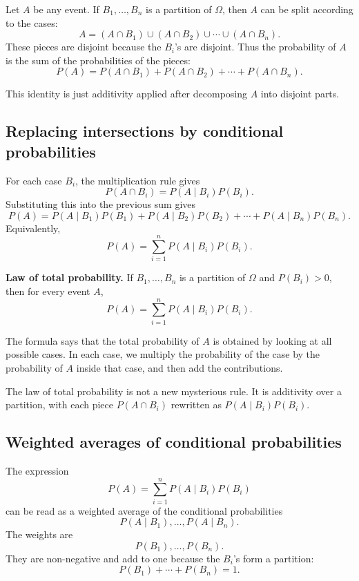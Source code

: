 Let \(A\) be any event. If \(B_1,
\ldots,B_n\) is a partition of \(\Omega\), then
\(A\) can be split according to the cases:
\[
A=(A\cap B_1)\cup(A\cap B_2)\cup\cdots\cup(A\cap B_n).
\]
These pieces are disjoint because the \(B_i\)'s are disjoint. Thus the
probability of \(A\) is the sum of the probabilities of the pieces:
\[
P(A)=P(A\cap B_1)+P(A\cap B_2)+\cdots+P(A\cap B_n).
\]

This identity is just additivity applied after decomposing \(A\) into disjoint
parts.

\subsection*{Replacing intersections by conditional probabilities}

For each case \(B_i\), the multiplication rule gives
\[
P(A\cap B_i)=P(A\mid B_i)P(B_i).
\]
Substituting this into the previous sum gives
\[
P(A)=P(A\mid B_1)P(B_1)+P(A\mid B_2)P(B_2)+\cdots+P(A\mid B_n)P(B_n).
\]
Equivalently,
\[
P(A)=\sum_{i=1}^n P(A\mid B_i)P(B_i).
\]

\begin{theorembox}
\textbf{Law of total probability.} If \(B_1,
\ldots,B_n\) is a partition of
\(\Omega\) and \(P(B_i)>0\), then for every event \(A\),
\[
P(A)=\sum_{i=1}^n P(A\mid B_i)P(B_i).
\]
\end{theorembox}

The formula says that the total probability of \(A\) is obtained by looking at
all possible cases. In each case, we multiply the probability of the case by the
probability of \(A\) inside that case, and then add the contributions.

\begin{remarkbox}
The law of total probability is not a new mysterious rule. It is additivity over
a partition, with each piece \(P(A\cap B_i)\) rewritten as
\(P(A\mid B_i)P(B_i)\).
\end{remarkbox}

\subsection*{Weighted averages of conditional probabilities}

The expression
\[
P(A)=\sum_{i=1}^n P(A\mid B_i)P(B_i)
\]
can be read as a weighted average of the conditional probabilities
\[
P(A\mid B_1),\ldots,P(A\mid B_n).
\]
The weights are
\[
P(B_1),\ldots,P(B_n).
\]
They are non-negative and add to one because the \(B_i\)'s form a partition:
\[
P(B_1)+\cdots+P(B_n)=1.
\]

